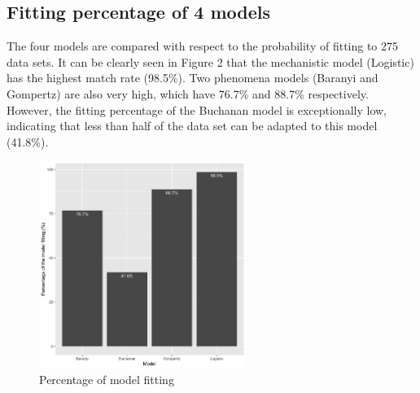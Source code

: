 \documentclass[11pt]{article}
\begin{document}
\subsection{Fitting percentage of 4 models}
The four models are compared with respect to the probability of fitting to 275 data sets. It can be clearly seen in Figure 2 that the mechanistic model (Logistic) has the highest match rate (98.5\%). Two phenomena models (Baranyi and Gompertz) are also very high, which have 76.7\% and 88.7\% respectively. However, the fitting percentage of the Buchanan model is exceptionally low, indicating that less than half of the data set can be adapted to this model (41.8\%). 
		\begin{figure}[htpb]
		\centering
		\includegraphics[width = 0.6\textwidth]{../Results/Fitting_percentage.png}
		      \caption{Percentage of model fitting}
	    \end{figure}
	    
\end{document}
